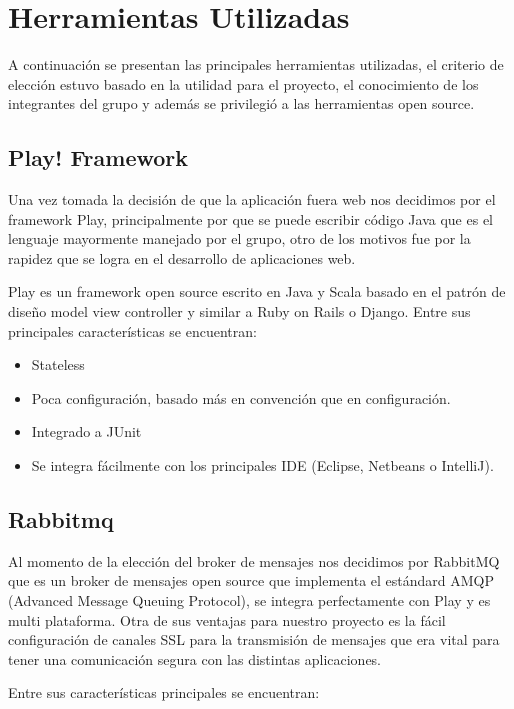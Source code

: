 \section{Herramientas Utilizadas}

A continuación se presentan las principales herramientas utilizadas, el criterio de elección estuvo basado en la utilidad para el proyecto, el conocimiento de los integrantes del grupo y además se privilegió a las herramientas open source.

\subsection{Play! Framework}

Una vez tomada la decisión de que la aplicación fuera web nos decidimos por el framework Play, principalmente por que se puede
escribir código Java que es el lenguaje mayormente manejado por el grupo, otro de los motivos fue por la rapidez que se logra en el desarrollo de aplicaciones web.

Play es un framework open source escrito en Java y Scala basado en el patrón de diseño model view controller y similar a Ruby on Rails o Django. Entre sus principales características se encuentran:

\begin{itemize}
\item Stateless
\item Poca configuración, basado más en convención que en configuración.
\item Integrado a JUnit	
\item Se integra fácilmente con los principales IDE (Eclipse, Netbeans o IntelliJ).
\end{itemize}

\subsection{Rabbitmq}

Al momento de la elección del broker de mensajes nos decidimos por RabbitMQ que es un broker de mensajes open source que implementa el estándard AMQP (Advanced Message Queuing Protocol), se integra perfectamente con Play y es multi plataforma. 
Otra de sus ventajas para nuestro proyecto es la fácil configuración de canales SSL para la transmisión de mensajes que era vital para tener una comunicación segura con las distintas aplicaciones.
 
Entre sus características principales se encuentran:

